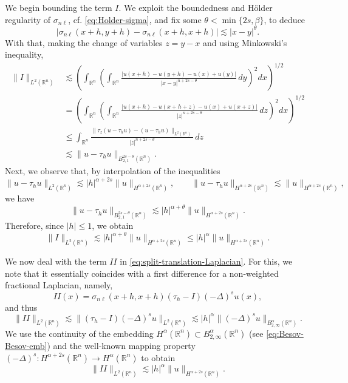 \documentclass{amsart}
\newcommand{\snl}{{\sigma_{n\ell}}}
\def\R{{\mathbb R}}
\theoremstyle{plain}
\numberwithin{equation}{section}
\numberwithin{table}{section}
\numberwithin{figure}{section}
\numberwithin{theorem}{section}
\numberwithin{corollary}{section}
\numberwithin{definition}{section}
\numberwithin{lemma}{section}
\numberwithin{proposition}{section}
\numberwithin{remark}{section}
\begin{document}
We begin bounding the term $I$. We exploit the boundedness and H\"older regularity of $\snl$, cf. \eqref{eq:Holder-sigma}, and fix some $\theta < \min\{2s, \beta\}$, to deduce 
\[
|\snl(x+h, y+h) -  \snl(x+h, x+h) | \lesssim |x-y|^\theta.
\]
With that, making the change of variables $z = y - x$ and using Minkowski's inequality,
\[ \begin{split}
\| I \|_{L^2(\R^n)} & \lesssim \left( \int_{\R^n} \left(\int_{\R^n} \frac{|u(x+h)-u(y+h) -u(x) + u(y)|}{|x-y|^{n+2s-\theta}} \, dy \right)^2 dx \right)^{1/2} \\
& = \left( \int_{\R^n} \left(\int_{\R^n} \frac{|u(x+h)-u(x+h+z) -u(x) + u(x+z)|}{|z|^{n+2s-\theta}}\, dz \right)^2 dx \right)^{1/2} \\
& \le \int_{\R^n} \frac{\| \tau_z( u - \tau_h u) -  ( u - \tau_h u)\|_{L^2(\R^n)}}{|z|^{n+2s-\theta}} \, dz \\
& \lesssim \| u - \tau_h u \|_{B^{2s-\theta}_{2,1}(\R^n)}.
\end{split} \]
Next, we observe that, by interpolation of the inequalities
\[
 \| u - \tau_h u \|_{L^2(\R^n)} \lesssim |h|^{\alpha+2s} \| u \|_{H^{\alpha+2s}(\R^n)} , \qquad  \| u - \tau_h u \|_{H^{\alpha+2s}(\R^n)} \lesssim \| u \|_{H^{\alpha+2s}(\R^n)} ,
\]
we have
\[
 \| u - \tau_h u \|_{B^{2s-\theta}_{2,1}(\R^n)} \lesssim |h|^{\alpha + \theta} \| u \|_{H^{\alpha+2s}(\R^n)}.
\]
Therefore, since $|h| \le 1$, we obtain
\begin{equation} \label{eq:bound-I}
\| I \|_{L^2(\R^n)} \lesssim |h|^{\alpha + \theta} \| u \|_{H^{\alpha+2s}(\R^n)} \le  |h|^{\alpha} \| u \|_{H^{\alpha+2s}(\R^n)} .
\end{equation}

We now deal with the term $II$ in \eqref{eq:split-translation-Laplacian}. For this, we note that it essentially coincides with a first difference for a non-weighted fractional Laplacian, namely, 
\[
II (x) = \snl(x+h, x+h) \left( \tau_h - I \right) (-\Delta)^s u (x),
\]
and thus
\[
\| II \|_{L^2(\R^n)} \lesssim  \| \left( \tau_h - I \right) (-\Delta)^s u \|_{L^2(\R^n)} \lesssim |h|^{\alpha} \|  (-\Delta)^s u \|_{B^{\alpha}_{2,\infty}(\R^n)}.
\]
We use the continuity of the embedding $H^{\alpha}(\R^n) \subset B^{\alpha}_{2,\infty}(\R^n)$ (see \eqref{eq:Besov-Besov-emb}) and the well-known mapping property $(-\Delta)^s \colon H^{\alpha+2s}(\R^n) \to H^{\alpha}(\R^n)$ to obtain
\begin{equation} \label{eq:bound-II}
\| II \|_{L^2(\R^n)} \lesssim |h|^{\alpha} \|  u \|_{H^{\alpha+2s}(\R^n)}.
\end{equation}
\end{document}
